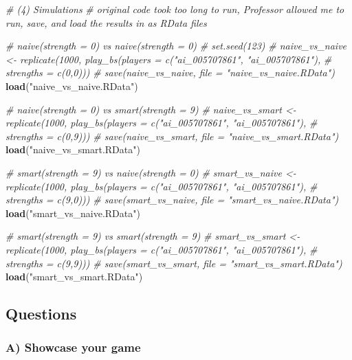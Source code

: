 \documentclass[
]{article}
\newenvironment{Shaded}{\begin{snugshade}}{\end{snugshade}}
\newcommand{\CommentTok}[1]{\textcolor[rgb]{0.56,0.35,0.01}{\textit{#1}}}
\newcommand{\FunctionTok}[1]{\textcolor[rgb]{0.13,0.29,0.53}{\textbf{#1}}}
\newcommand{\NormalTok}[1]{#1}
\newcommand{\StringTok}[1]{\textcolor[rgb]{0.31,0.60,0.02}{#1}}
\begin{document}
\begin{Shaded}
\begin{Highlighting}[]
\CommentTok{\# (4) Simulations }
\CommentTok{\# original code took too long to run, Professor allowed me to run, save, and load the results in as RData files }

\CommentTok{\# naive(strength = 0) vs naive(strength = 0)}
\CommentTok{\# set.seed(123)}
\CommentTok{\# naive\_vs\_naive \textless{}{-} replicate(1000, play\_bs(players = c("ai\_005707861", "ai\_005707861"), }
\CommentTok{\#                                           strengths = c(0,0)))}
\CommentTok{\# save(naive\_vs\_naive, file = "naive\_vs\_naive.RData")}
\FunctionTok{load}\NormalTok{(}\StringTok{"naive\_vs\_naive.RData"}\NormalTok{)}

\CommentTok{\# naive(strength = 0) vs smart(strength = 9)}
\CommentTok{\# naive\_vs\_smart \textless{}{-} replicate(1000, play\_bs(players = c("ai\_005707861", "ai\_005707861"), }
\CommentTok{\#                                           strengths = c(0,9)))}
\CommentTok{\# save(naive\_vs\_smart, file = "naive\_vs\_smart.RData")}
\FunctionTok{load}\NormalTok{(}\StringTok{"naive\_vs\_smart.RData"}\NormalTok{)}

\CommentTok{\# smart(strength = 9) vs naive(strength = 0)}
\CommentTok{\# smart\_vs\_naive \textless{}{-} replicate(1000, play\_bs(players = c("ai\_005707861", "ai\_005707861"), }
\CommentTok{\#                                           strengths = c(9,0)))}
\CommentTok{\# save(smart\_vs\_naive, file = "smart\_vs\_naive.RData")}
\FunctionTok{load}\NormalTok{(}\StringTok{"smart\_vs\_naive.RData"}\NormalTok{)}

\CommentTok{\# smart(strength = 9) vs smart(strength = 9)}
\CommentTok{\# smart\_vs\_smart \textless{}{-} replicate(1000, play\_bs(players = c("ai\_005707861", "ai\_005707861"), }
\CommentTok{\#                                           strengths = c(9,9)))}
\CommentTok{\# save(smart\_vs\_smart, file = "smart\_vs\_smart.RData")}
\FunctionTok{load}\NormalTok{(}\StringTok{"smart\_vs\_smart.RData"}\NormalTok{)}
\end{Highlighting}
\end{Shaded}

\subsection{Questions}\label{questions}

\subsubsection{A) Showcase your game}\label{a-showcase-your-game}
\end{document}
